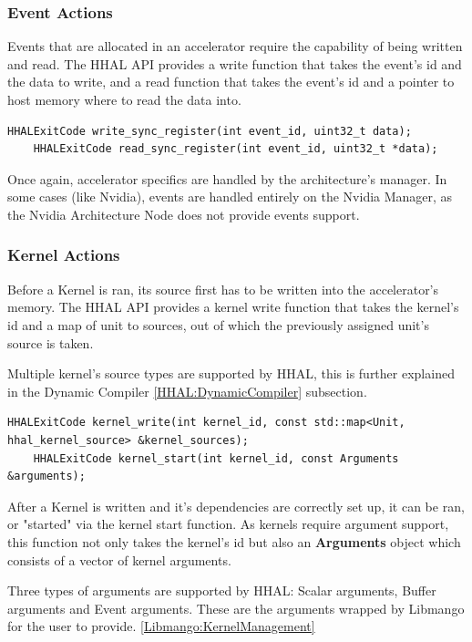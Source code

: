 \subsubsection{Event Actions}
Events that are allocated in an accelerator require the capability of being written and read. The HHAL API provides a write function that takes the event's id and the data to write, and a read function that takes the event's id and a pointer to host memory where to read the data into.

\begin{lstlisting}[style=CStyle, caption=HHAL API - Buffer actions]
    HHALExitCode write_sync_register(int event_id, uint32_t data);
    HHALExitCode read_sync_register(int event_id, uint32_t *data);
\end{lstlisting}

Once again, accelerator specifics are handled by the architecture's manager. In some cases (like Nvidia), events are handled entirely on the Nvidia Manager, as the Nvidia Architecture Node does not provide events support.

\subsubsection{Kernel Actions} \label{HHAL:KernelActions}
Before a Kernel is ran, its source first has to be written into the accelerator's memory. The HHAL API provides a kernel write function that takes the kernel's id and a map of unit to sources, out of which the previously assigned unit's source is taken.

Multiple kernel's source types are supported by HHAL, this is further explained in the Dynamic Compiler \ref{HHAL:DynamicCompiler} subsection.

\begin{lstlisting}[style=CStyle, caption=HHAL API - Kernel actions]
    HHALExitCode kernel_write(int kernel_id, const std::map<Unit, hhal_kernel_source> &kernel_sources);
    HHALExitCode kernel_start(int kernel_id, const Arguments &arguments);
\end{lstlisting}

After a Kernel is written and it's dependencies are correctly set up, it can be ran, or "started" via the kernel start function. As kernels require argument support, this function not only takes the kernel's id but also an \textbf{Arguments} object which consists of a vector of kernel arguments.

Three types of arguments are supported by HHAL: Scalar arguments, Buffer arguments and Event arguments. These are the arguments wrapped by Libmango for the user to provide. \ref{Libmango:KernelManagement} 

